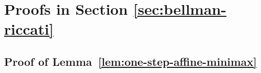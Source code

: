 \documentclass[10pt,journal,twoside]{IEEEtran}
\theoremstyle{definition}
\theoremstyle{remark}
\begin{document}


 














\appendices

\section{Proofs in Section \ref{sec:bellman-riccati}}

\subsection{Proof of Lemma~\ref{lem:one-step-affine-minimax}}
\label{app:one-step-affine-minimax}
\end{document}
